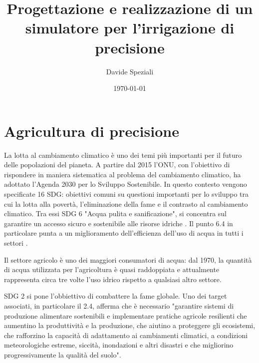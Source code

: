 \documentclass[12pt,a4paper,openright,twoside]{book}
\title{Progettazione e realizzazione di un simulatore per l'irrigazione di precisione}
\author{Davide Speziali}
\date{\today}
\begin{document}
\frontmatter\frontispiece
%

%
\tableofcontents

\mainmatter
%
%
\chapter{Agricultura di precisione}
%
La lotta al cambiamento climatico è uno dei temi più importanti per il futuro delle popolazioni del pianeta.
A partire dal 2015 l'\ac{ONU}, con l'obiettivo di rispondere in maniera sistematica al problema del cambiamento climatico, ha adottato l'Agenda 2030 per lo Sviluppo Sostenibile.
In questo contesto vengono specificate 16 \ac{SDG}: obiettivi comuni su questioni importanti per lo sviluppo tra cui la lotta alla povertà, l'eliminazione della fame e il contrasto al cambiamento climatico. Tra essi \ac{SDG} 6 "Acqua pulita e sanificazione", si concentra sul garantire un accesso sicuro e sostenibile alle risorse idriche \cite{SDG-6}. Il punto 6.4 in particolare punta a un miglioramento dell'efficienza dell'uso di acqua in tutti i settori \cite{SDG-6-4-1,UN-WATER-WATER-USE-EFF-21}.

Il settore agricolo è uno dei maggiori consumatori di acqua: dal 1970, la quantità di acqua utilizzata per l'agricoltura è quasi raddoppiata e attualmente rappresenta circa tre volte l'uso idrico rispetto a qualsiasi altro settore\cite{FAO-AQUASTAT-2020}.

\ac{SDG} 2 si pone l'obbiettivo di combattere la fame globale. Uno dei target associati, in particolare il 2.4, afferma che è necessario "garantire sistemi di produzione alimentare sostenibili e implementare pratiche agricole resilienti che aumentino la produttività e la produzione, che aiutino a proteggere gli ecosistemi, che rafforzino la capacità di adattamento ai cambiamenti climatici, a condizioni meteorologiche estreme, siccità, inondazioni e altri disastri e che migliorino progressivamente la qualità del suolo"\cite{SDG-2.4}.
\end{document}
